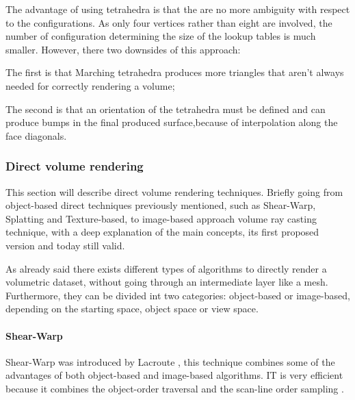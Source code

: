 \documentclass[12pt,a4paper]{extarticle}
\begin{document}
The advantage of using tetrahedra is that the are no more ambiguity with respect to the configurations. As only four vertices rather than eight are involved, the number of configuration determining the size of the lookup tables is much smaller. However, there two downsides of this approach:

The first  is that Marching tetrahedra produces more triangles that aren't always needed for correctly rendering a volume; 

The second is that an orientation of the tetrahedra must be defined and can produce bumps in the final produced surface,because of interpolation along the face diagonals.

\subsubsection{Direct volume rendering} %
This section will describe direct volume rendering techniques. Briefly going from object-based direct techniques previously mentioned, such as Shear-Warp, Splatting and Texture-based, to image-based approach volume ray casting technique, with a deep explanation of the main concepts, its first proposed version and today still valid.

As already said there exists different types of algorithms to directly render a volumetric dataset, without going through an intermediate layer like a mesh.
Furthermore, they can be divided int two categories: object-based or image-based, depending on the starting space, object space or view space.

\paragraph{Shear-Warp} Shear-Warp was introduced by Lacroute \cite{Lacroute:1994:FVR:192161.192283}, this technique combines some of the advantages of both object-based and image-based algorithms. IT is very efficient because it combines the object-order traversal and the scan-line order sampling \cite{PFISTER2005229}.
\end{document}
